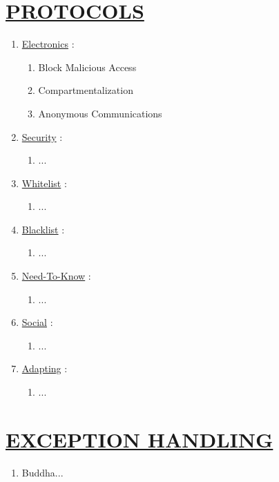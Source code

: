 \documentclass[11pt]{article}
\begin{document}
\section*{\ul{PROTOCOLS}}
\begin{enumerate}
	\item[] \ul{Electronics} :
	\begin{enumerate}
		\item[] Block Malicious Access
		\item[] Compartmentalization
		\item[] Anonymous Communications
	\end{enumerate}

	\item[] \ul{Security} :
	\begin{enumerate}
		\item[] ...
	\end{enumerate}

	\item[] \ul{Whitelist} :
	\begin{enumerate}
		\item[] ...
	\end{enumerate}
	
	\item[] \ul{Blacklist} :
	\begin{enumerate}
		\item[] ...
	\end{enumerate}

	\item[] \ul{Need-To-Know} :
	\begin{enumerate}
		\item[] ...
	\end{enumerate}

	\item[] \ul{Social}  :
	\begin{enumerate}
		\item[] ...
	\end{enumerate}

	\item[] \ul{Adapting} :
	\begin{enumerate}
		\item[] ...
	\end{enumerate}
\end{enumerate}


\section*{\ul{EXCEPTION HANDLING}}
\begin{enumerate}
	\item[] Buddha...
\end{enumerate}
\end{document}
